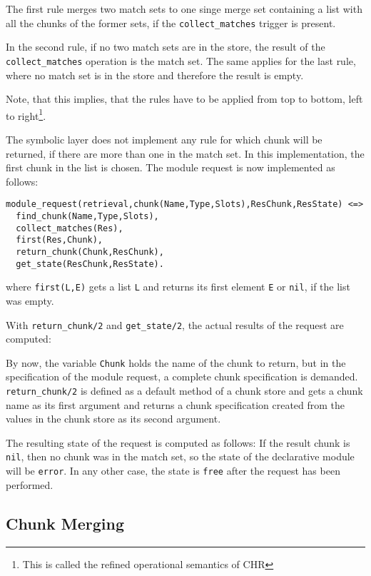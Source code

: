 The first rule merges two match sets to one singe merge set containing a list with all the chunks of the former sets, if the \verb|collect_matches| trigger is present. 

In the second rule, if no two match sets are in the store, the result of the \verb|collect_matches| operation is the match set. The same applies for the last rule, where no match set is in the store and therefore the result is empty.

Note, that this implies, that the rules have to be applied from top to bottom, left to right\footnote{This is called the refined operational semantics of CHR}.

The symbolic layer does not implement any rule for which chunk will be returned, if there are more than one in the match set. In this implementation, the first chunk in the list is chosen. The module request is now implemented as follows:

\begin{lstlisting}
module_request(retrieval,chunk(Name,Type,Slots),ResChunk,ResState) <=> 
  find_chunk(Name,Type,Slots),
  collect_matches(Res),
  first(Res,Chunk),
  return_chunk(Chunk,ResChunk),
  get_state(ResChunk,ResState).
\end{lstlisting}

where \verb|first(L,E)| gets a list \verb|L| and returns its first element \verb|E| or \verb|nil|, if the list was empty.

With \verb|return_chunk/2| and \verb|get_state/2|, the actual results of the request are computed:

By now, the variable \verb|Chunk| holds the name of the chunk to return, but in the specification of the module request, a complete chunk specification is demanded. \verb|return_chunk/2| is defined as a default method of a chunk store and gets a chunk name as its first argument and returns a chunk specification created from the values in the chunk store as its second argument. 

The resulting state of the request is computed as follows: If the result chunk is \verb|nil|, then no chunk was in the match set, so the state of the declarative module will be \verb|error|. In any other case, the state is \verb|free| after the request has been performed.

\subsection{Chunk Merging}

